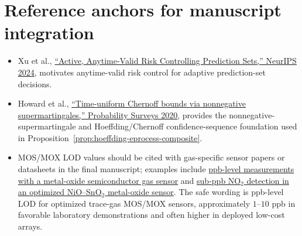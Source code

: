 \documentclass[11pt]{article}
\begin{document}
\section{Reference anchors for manuscript integration}

\begin{itemize}
\item Xu et al., \href{https://doi.org/10.52202/079017-1920}{``Active, Anytime-Valid Risk Controlling Prediction Sets,'' NeurIPS 2024}, motivates anytime-valid risk control for adaptive prediction-set decisions.
\item Howard et al., \href{https://doi.org/10.1214/18-PS321}{``Time-uniform Chernoff bounds via nonnegative supermartingales,'' Probability Surveys 2020}, provides the nonnegative-supermartingale and Hoeffding/Chernoff confidence-sequence foundation used in Proposition~\ref{prop:hoeffding-eprocess-composite}.
\item MOS/MOX LOD values should be cited with gas-specific sensor papers or datasheets in the final manuscript; examples include \href{https://doi.org/10.1016/j.snb.2018.06.097}{ppb-level measurements with a metal-oxide semiconductor gas sensor} and \href{https://doi.org/10.1016/j.snb.2024.135916}{sub-ppb NO$_2$ detection in an optimized NiO--SnO$_2$ metal-oxide sensor}.  The safe wording is ppb-level LOD for optimized trace-gas MOS/MOX sensors, approximately $1$--$10$ ppb in favorable laboratory demonstrations and often higher in deployed low-cost arrays.
\end{itemize}
\end{document}
